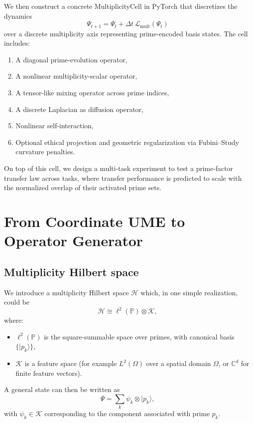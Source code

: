 \documentclass[11pt]{article}
\begin{document}
We then construct a concrete MultiplicityCell in PyTorch that discretizes the dynamics
\[
\Psi_{t+1} = \Psi_t + \Delta t\,\mathcal{L}_{\mathrm{mult}}(\Psi_t)
\]
over a discrete multiplicity axis representing prime-encoded basis states. The cell includes:
\begin{enumerate}[nosep]
\item A diagonal prime-evolution operator,
\item A nonlinear multiplicity-scalar operator,
\item A tensor-like mixing operator across prime indices,
\item A discrete Laplacian as diffusion operator,
\item Nonlinear self-interaction,
\item Optional ethical projection and geometric regularization via Fubini--Study curvature penalties.
\end{enumerate}

On top of this cell, we design a multi-task experiment to test a prime-factor transfer law across tasks, where transfer performance is predicted to scale with the normalized overlap of their activated prime sets.

\section{From Coordinate UME to Operator Generator}

\subsection{Multiplicity Hilbert space}

We introduce a multiplicity Hilbert space $\mathcal{H}$ which, in one simple realization, could be
\[
\mathcal{H} \cong \ell^2(\mathbb{P}) \otimes \mathcal{K},
\]
where:
\begin{itemize}[nosep]
\item $\ell^2(\mathbb{P})$ is the square-summable space over primes, with canonical basis $\{\lvert p_k\rangle\}$,
\item $\mathcal{K}$ is a feature space (for example $L^2(\Omega)$ over a spatial domain $\Omega$, or $\mathbb{C}^d$ for finite feature vectors).
\end{itemize}

A general state can then be written as
\[
\Psi = \sum_{k} \psi_k \otimes \lvert p_k\rangle,
\]
with $\psi_k \in \mathcal{K}$ corresponding to the component associated with prime $p_k$.
\end{document}
